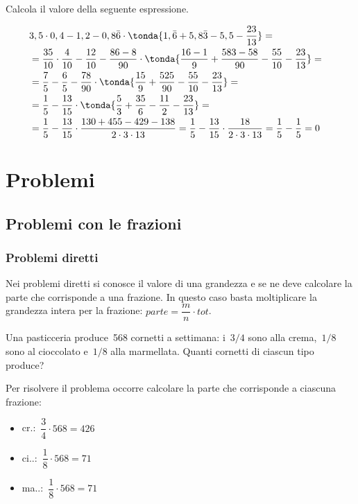 \begin{esempio}{}{}
Calcola il valore della seguente espressione.
   
\begin{align*}
&3,5 \cdot 0,4-1,2-0,8\bar{6}\cdot\tonda{
   1,\bar{6}+5,8\bar{3}-5,5-\frac{23}{13}
}=&\\
&=\frac{35}{10} \cdot \frac{4}{10}-\frac{12}{10}-
 \frac{86-8}{90}\cdot\tonda{
   \frac{16-1}{9}+\frac{583-58}{90}-\frac{55}{10}-\frac{23}{13}
 }=\\
&=\frac{7}{5}-\frac{6}{5}-
 \frac{78}{90}\cdot\tonda{
   \frac{15}{9}+\frac{525}{90}-\frac{55}{10}-\frac{23}{13}
 }=\\
&=\frac{1}{5}-
 \frac{13}{15}\cdot\tonda{
   \frac{5}{3}+\frac{35}{6}-\frac{11}{2}-\frac{23}{13}
 }=\\
&=\frac{1}{5}-
 \frac{13}{15}\cdot
   \frac{130+455-429-138}{2\cdot3\cdot13}=
 \frac{1}{5}-\frac{13}{15}\cdot\frac{18}{2\cdot3\cdot13}=
\frac{1}{5}-\frac{1}{5}=0
\end{align*}

\end{esempio}


\section{Problemi}
\label{sec:razionali_problemi}


\subsection{Problemi con le frazioni}

\subsubsection{Problemi diretti}
Nei problemi diretti si conosce il valore di una grandezza e se ne deve 
calcolare la parte che corrisponde a una frazione. 
In questo caso basta moltiplicare la grandezza intera per la frazione: 
\quad \(parte = \dfrac{m}{n} \cdot tot\).

 \begin{esempio}{}{}
Una pasticceria produce~568 cornetti a settimana: i~\(3/4\) sono alla 
crema,~\(1/8\) sono al cioccolato e~\(1/8\) alla marmellata. 
Quanti cornetti di ciascun tipo produce?

Per risolvere il problema occorre calcolare la parte che corrisponde a 
ciascuna frazione:

\begin{htmulticols}{3}
\begin{itemize} [noitemsep]
\item cr.:~\(\dfrac{3}{4}\cdot 568 =426\)
\item ci..:~\(\dfrac{1}{8}\cdot 568 =71\)
\item ma..:~\(\dfrac{1}{8}\cdot 568 =71\)
\end{itemize}
\end{htmulticols}
 \end{esempio}


